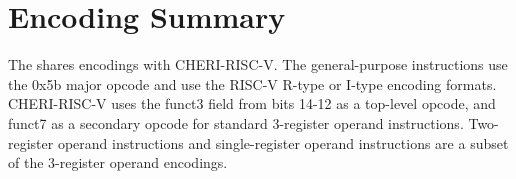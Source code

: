{%

	\section{Encoding Summary}

	The \cherimcuisa{} shares encodings with CHERI-RISC-V.
	The general-purpose instructions use the 0x5b major opcode and use the RISC-V R-type or I-type encoding formats.
	CHERI-RISC-V uses the funct3 field from bits 14-12 as a top-level opcode, and funct7 as a secondary
	opcode for standard 3-register operand instructions.
	Two-register operand instructions and single-register operand instructions are a subset
	of the 3-register operand encodings.

}
